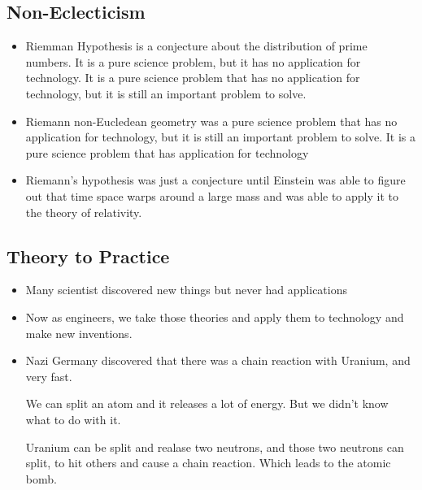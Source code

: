 \documentclass{article}
\begin{document}
\subsection{Non-Eclecticism}
\begin{itemize}
  \item Riemman Hypothesis is a conjecture about the distribution of prime numbers.
    It is a pure science problem, but it has no application for technology.
    It is a pure science problem that has no application for technology,
    but it is still an important problem to solve.
  \item Riemann non-Eucledean geometry was a pure science problem
    that has no application for technology, but it is still an important problem to solve.
    It is a pure science problem that has application for technology
  \item Riemann's hypothesis was just a conjecture until Einstein
    was able to figure out that time space warps around a large mass
    and was able to apply it to the theory of relativity.
\end{itemize}

\subsection{Theory to Practice}
\begin{itemize}
  \item Many scientist discovered new things but never had applications
  \item Now as engineers, we take those theories and apply them to technology
    and make new inventions.
  \item Nazi Germany discovered that there was a chain reaction with Uranium, and very fast.

    We can split an atom and it releases a lot of energy. But we didn't know what to do with it.

    Uranium can be split and realase two neutrons, and those two neutrons can split, to hit others and
    cause a chain reaction. Which leads to the atomic bomb.
\end{itemize}
\end{document}
